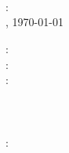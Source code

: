 \begin{titlepage}
  \vspace*{-1.23cm}
  \Logo

  \begin{center}
    \vspace*{5\baselineskip}
    \Institution
    \vspace*{2\baselineskip}
    \textbf{\large \Thesis\\}
    \par\bigskip
    \textbf{\LARGE \Title}
    \par\bigskip
    \textbf{\large \Subtitle}\\
    \vspace*{2\baselineskip}
    \large \Author\hfill\\
    \IDLabel: \ID\\
    \vspace*{\baselineskip}
    \City, \today\\
  \end{center}
  \vfill
  \SupervisorLabel:      \Supervisor\\
  \ReviewerALabel:  \ReviewerA\\
  \ReviewerBLabel: \ReviewerB\\
  \\
  \\
  \\
  \FieldLabel:  \Field\\
  \vspace*{2\baselineskip}
\end{titlepage}
\thispagestyle{empty}
\setcounter{page}{2}
\clearpage
